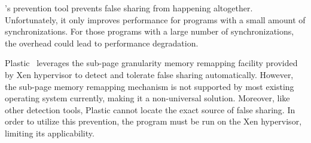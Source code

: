 \Sheriff{}'s prevention tool prevents false sharing from happening altogether.
Unfortunately, it only improves performance for programs with a small amount of synchronizations. 
For those programs with a large number 
of synchronizations, the overhead could lead to performance degradation.

Plastic~\cite{OSdetection} leverages the sub-page granularity memory remapping facility
provided by Xen hypervisor to detect and tolerate false sharing automatically.
However, the sub-page memory remapping mechanism is not supported by most existing operating 
system currently, making it a non-universal solution. Moreover, like other
detection tools, Plastic cannot locate the exact source of false sharing.  
In order to utilize this prevention, the program must be run on the Xen hypervisor,
limiting its applicability.
